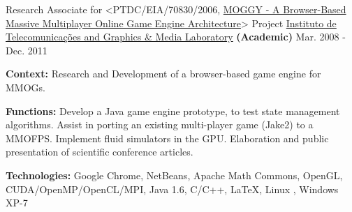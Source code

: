 \begin{cventries}
  \cventry
    {Research Associate for <PTDC/EIA/70830/2006, \href{http://www.di.ubi.pt/~agomes/moggy/index.html}{MOGGY - A Browser-Based Massive Multiplayer Online Game Engine Architecture}> Project} %
    {\href{http://www.it.ubi.pt/medialab}{Instituto de Telecomunica\c{c}\~{o}es and Graphics \& Media Laboratory} \textbf{(Academic)}} %
    {} %
    {Mar. 2008 - Dec. 2011} %
    {
      \begin{cvitems} %
		\item[] {\textbf{Context:} Research and Development of a browser-based game engine for MMOGs.}
		\item[] {\textbf{Functions:} Develop a Java game engine prototype, to test state management algorithms. Assist in porting an existing multi-player game (Jake2) to a MMOFPS. %
Implement fluid simulators in the GPU. 
Elaboration and public presentation of scientific conference articles.
		}
		\item[] {\textbf{Technologies:} 
		\textcolor{rainbowcolor-olive}{Google Chrome}, 
		\textcolor{rainbowcolor-olive}{NetBeans}, 
		\textcolor{rainbowcolor-indigo}{Apache Math Commons},
		\textcolor{rainbowcolor-indigo}{OpenGL}, 
		\textcolor{rainbowcolor-indigo}{CUDA/OpenMP/OpenCL/MPI},
		\textcolor{rainbowcolor-indigo}{Java 1.6}, 
		\textcolor{rainbowcolor-indigo}{C/C++}, 
		\textcolor{rainbowcolor-indigo}{LaTeX}, 
		\textcolor{rainbowcolor-orange}{Linux%
        }, 
		\textcolor{rainbowcolor-orange}{Windows XP-7}}
      \end{cvitems}
    }     
    

\end{cventries}
